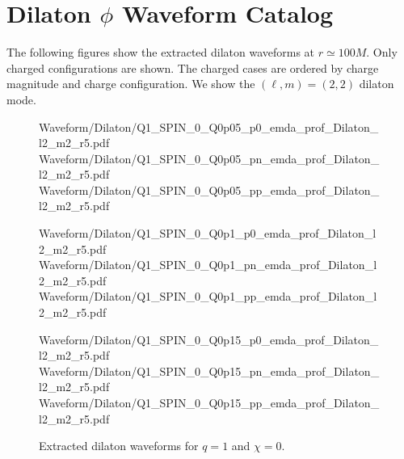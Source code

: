 \section{\texorpdfstring{Dilaton $\phi$ Waveform Catalog}{Dilaton Waveform Catalog}}
\label{app:dilaton_waveform_catalog}

The following figures show the extracted dilaton waveforms at
$r\simeq 100M$. Only charged configurations are shown. The charged
cases are ordered by charge magnitude and charge configuration. We show
the $(\ell,m)=(2,2)$ dilaton mode.

\begin{figure}[p]
\centering

{Waveform/Dilaton/Q1_SPIN_0_Q0p05_p0_emda_prof_Dilaton_l2_m2_r5.pdf}
\hfill
{}
{Waveform/Dilaton/Q1_SPIN_0_Q0p05_pn_emda_prof_Dilaton_l2_m2_r5.pdf}
\hfill
{}
{Waveform/Dilaton/Q1_SPIN_0_Q0p05_pp_emda_prof_Dilaton_l2_m2_r5.pdf}

\vspace{0.6em}

{Waveform/Dilaton/Q1_SPIN_0_Q0p1_p0_emda_prof_Dilaton_l2_m2_r5.pdf}
\hfill
{}
{Waveform/Dilaton/Q1_SPIN_0_Q0p1_pn_emda_prof_Dilaton_l2_m2_r5.pdf}
\hfill
{}
{Waveform/Dilaton/Q1_SPIN_0_Q0p1_pp_emda_prof_Dilaton_l2_m2_r5.pdf}

\vspace{0.6em}

{Waveform/Dilaton/Q1_SPIN_0_Q0p15_p0_emda_prof_Dilaton_l2_m2_r5.pdf}
\hfill
{}
{Waveform/Dilaton/Q1_SPIN_0_Q0p15_pn_emda_prof_Dilaton_l2_m2_r5.pdf}
\hfill
{}
{Waveform/Dilaton/Q1_SPIN_0_Q0p15_pp_emda_prof_Dilaton_l2_m2_r5.pdf}

\caption{Extracted dilaton waveforms for $q=1$ and $\chi=0$.}
\label{fig:dilaton_catalog_q1_chi0}
\end{figure}

